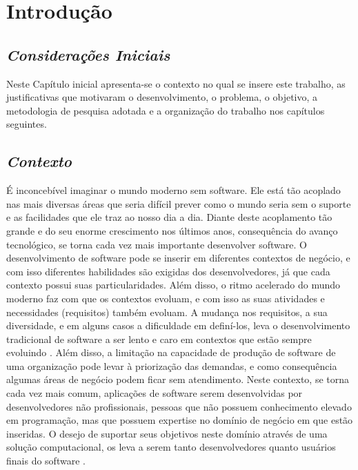 \chapter[Introdução]{Introdução}

\section{\textit{Considerações Iniciais}}

Neste Capítulo inicial apresenta-se o contexto no qual se insere este trabalho, as
justificativas que motivaram o desenvolvimento, o problema, o objetivo, a
metodologia de pesquisa adotada e a organização do trabalho nos capítulos seguintes.

\section{\textit{Contexto}}

É inconcebível imaginar o mundo moderno sem software. Ele está tão acoplado nas mais diversas áreas que seria difícil prever como o mundo seria sem o suporte e as facilidades que ele traz ao nosso dia a dia. Diante deste acoplamento tão grande e do seu enorme crescimento nos últimos anos, consequência do avanço tecnológico, se torna cada vez mais importante desenvolver software. O desenvolvimento de software pode se inserir em diferentes contextos de negócio, e com isso diferentes habilidades são exigidas dos desenvolvedores, já que cada contexto possui suas particularidades. Além disso, o ritmo acelerado do mundo moderno faz com que os contextos evoluam, e com isso as suas atividades e necessidades (requisitos) também evoluam. A mudança nos requisitos, a sua diversidade, e em alguns casos a dificuldade em definí-los, leva o desenvolvimento tradicional de software a ser lento e caro em contextos que estão sempre evoluindo \cite{lieberman2006}. Além disso, a limitação na capacidade de produção de software de uma organização pode levar à priorização das demandas, e como consequência algumas áreas de negócio podem ficar sem atendimento. Neste contexto, se torna cada vez mais comum, aplicações de software serem desenvolvidas por desenvolvedores não profissionais, pessoas que não possuem conhecimento elevado em programação, mas que possuem expertise no domínio de negócio em que estão inseridas. O desejo de suportar seus objetivos neste domínio através de uma solução computacional, os leva a serem tanto desenvolvedores quanto usuários finais do software \cite{lieberman2006}.

